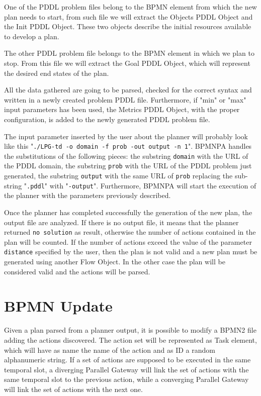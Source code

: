 One of the PDDL problem files belong to the BPMN element from which the new plan needs to start, from such file we will extract the Objects PDDL Object and the Init PDDL Object. These two objects describe the initial resources available to develop a plan.

The other PDDL problem file belongs to the BPMN element in which we plan to stop. From this file we will extract the Goal PDDL Object, which will represent the desired end states of the plan.

All the data gathered are going to be parsed, checked for the correct syntax and written in a newly created problem PDDL file. Furthermore, if "min" or "max" input parameters has been used, the Metrics PDDL Object, with the proper configuration, is added to the newly generated PDDL problem file.

The input parameter inserted by the user about the planner will probably look like this "\texttt{./LPG-td -o domain -f prob -out output -n 1}". BPMNPA handles the substitutions of the following pieces: the substring \texttt{domain} with the URL of the PDDL domain, the substring \texttt{prob} with the URL of the PDDL problem just generated, the substring \texttt{output} with the same URL of \texttt{prob} replacing the sub-string "\texttt{.pddl}" with "\texttt{-output}".
Furthermore, BPMNPA will start the execution of the planner with the parameters previously described.

Once the planner has completed successfully the generation of the new plan, the output file are analyzed. 
If there is no output file, it means that the planner returned \texttt{no solution} as result, otherwise the number of actions contained in the plan will be counted. 
If the number of actions exceed the value of the parameter \texttt{distance} specified by the user, then the plan is not valid and a new plan must be generated using another Flow Object. In the other case the plan will be considered valid and the actions will be parsed.


\section{BPMN Update}
\label{sec:456}
Given a plan parsed from a planner output, it is possible to modify a BPMN2 file adding the actions discovered. The action set will be represented as Task element, which will have as name the name of the action and as ID a random alphanumeric string. If a set of actions are supposed to be executed in the same temporal slot, a diverging Parallel Gateway will link the set of actions with the same temporal slot to the previous action, while a converging Parallel Gateway will link the set of actions with the next one.

